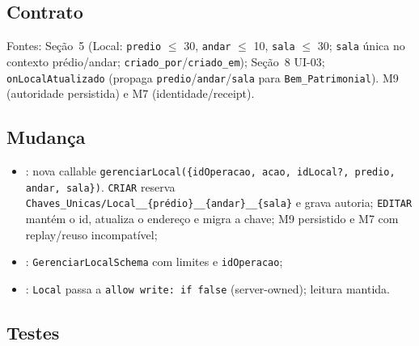 \subsection{Contrato}

Fontes: Seção~5 (Local: \texttt{predio} $\le$ 30, \texttt{andar} $\le$ 10,
\texttt{sala} $\le$ 30; \texttt{sala} única no contexto prédio/andar;
\texttt{criado\_por}/\texttt{criado\_em}); Seção~8 UI-03; \texttt{onLocalAtualizado}
(propaga \texttt{predio}/\texttt{andar}/\texttt{sala} para \texttt{Bem\_Patrimonial}).
M9 (autoridade persistida) e M7 (identidade/receipt).

\subsection{Mudança}

\begin{itemize}
  \item {}: nova callable
  \texttt{gerenciarLocal(\{idOperacao, acao, idLocal?, predio, andar, sala\})}.
  \texttt{CRIAR} reserva \texttt{Chaves\_Unicas/Local\_\_\{prédio\}\_\_\{andar\}\_\_\{sala\}}
  e grava autoria; \texttt{EDITAR} mantém o id, atualiza o endereço e migra a
  chave; M9 persistido e M7 com replay/reuso incompatível;
  \item {}: \texttt{GerenciarLocalSchema}
  com limites e \texttt{idOperacao};
  \item {}: \texttt{Local} passa a \texttt{allow write: if false}
  (server-owned); leitura mantida.
\end{itemize}

\subsection{Testes}

